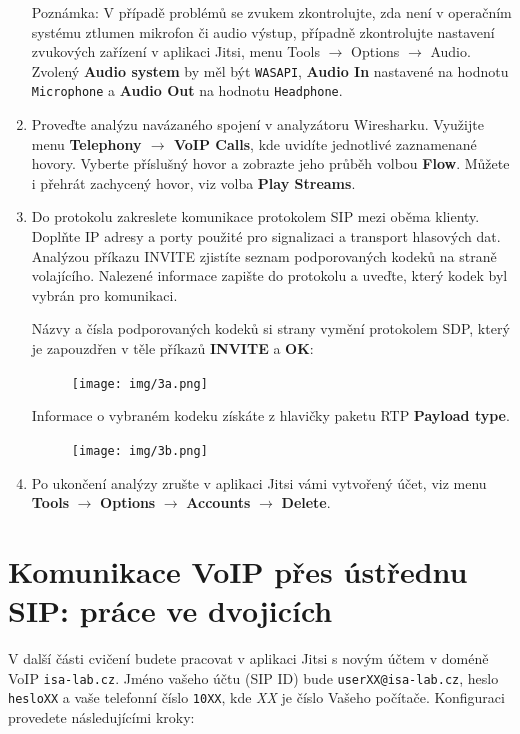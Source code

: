 \begin{enumerate}
     {\small Poznámka: V případě problémů se zvukem zkontrolujte, zda není v operačním systému ztlumen mikrofon či audio výstup, případně zkontrolujte nastavení zvukových zařízení v aplikaci Jitsi, menu Tools $\rightarrow$ Options $\rightarrow$ Audio. Zvolený {\bf Audio system} by měl být {\tt WASAPI}, {\bf Audio In} nastavené na hodnotu {\tt Microphone} a {\bf Audio Out} na hodnotu {\tt Headphone}. }

   \item Proveďte analýzu navázaného spojení v analyzátoru Wiresharku. Využijte menu {\bf Telephony $\rightarrow$ VoIP Calls}, kde uvidíte jednotlivé zaznamenané hovory. Vyberte příslušný hovor a zobrazte jeho průběh volbou {\bf Flow}. Můžete i přehrát zachycený hovor, viz volba {\bf Play Streams}.
     
    \item Do protokolu zakreslete komunikace protokolem SIP mezi oběma klienty. Doplňte IP adresy a porty použité pro signalizaci a transport hlasových dat. Analýzou příkazu INVITE zjistíte seznam podporovaných kodeků na straně volajícího. Nalezené informace zapište do protokolu a uveďte, který kodek byl vybrán pro komunikaci. 


      Názvy a čísla podporovaných kodeků si strany vymění protokolem SDP, který je zapouzdřen v těle příkazů {\bf INVITE} a {\bf OK}:
\begin{figure}[h!]
  \centering
  \texttt{[image: img/3a.png]}
\end{figure}

\noindent Informace o vybraném kodeku získáte z hlavičky paketu RTP {\bf Payload type}.
\begin{figure}[h!]
  \centering
  \texttt{[image: img/3b.png]}
\end{figure}

  \item Po ukončení analýzy zrušte v aplikaci Jitsi vámi vytvořený účet, viz menu {\bf Tools} $\rightarrow$ {\bf Options} $\rightarrow$ {\bf Accounts} $\rightarrow$ {\bf Delete}. 
\end{enumerate}


\section{Komunikace VoIP přes ústřednu SIP: práce ve dvojicích}
V další části cvičení budete pracovat v aplikaci Jitsi s novým účtem v doméně VoIP {\tt isa-lab.cz}. Jméno vašeho účtu (SIP ID) bude {\tt userXX@isa-lab.cz}, heslo {\tt hesloXX} a vaše telefonní číslo {\tt 10XX}, kde {\it XX} je číslo Vašeho počítače. Konfiguraci provedete následujícími kroky: 

